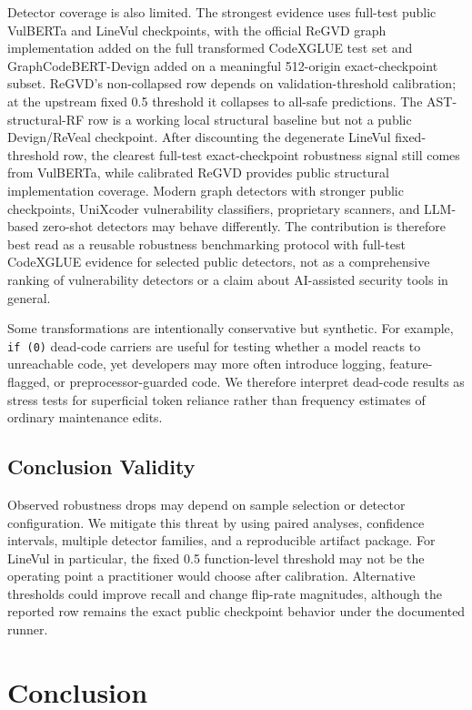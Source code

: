 \documentclass[a4paper,fleqn]{cas-dc}
\begin{document}
Detector coverage is also limited. The strongest evidence uses full-test public
VulBERTa and LineVul checkpoints, with the official ReGVD graph implementation
added on the full transformed CodeXGLUE test set and GraphCodeBERT-Devign added
on a meaningful 512-origin exact-checkpoint subset. ReGVD's non-collapsed row
depends on validation-threshold calibration; at the upstream fixed 0.5
threshold it collapses to all-safe predictions. The AST-structural-RF row is a
working local structural baseline but not a public Devign/ReVeal checkpoint.
After discounting the degenerate LineVul fixed-threshold row, the clearest
full-test exact-checkpoint robustness signal still comes from VulBERTa, while
calibrated ReGVD provides public structural implementation coverage. Modern
graph detectors with stronger public checkpoints, UniXcoder vulnerability
classifiers, proprietary scanners, and LLM-based zero-shot detectors may behave
differently. The contribution is therefore best read as a reusable robustness
benchmarking protocol with full-test CodeXGLUE evidence for selected public
detectors, not as a comprehensive ranking of vulnerability detectors or a claim
about AI-assisted security tools in general.

Some transformations are intentionally conservative but synthetic. For
example, \texttt{if (0)} dead-code carriers are useful for testing whether a
model reacts to unreachable code, yet developers may more often introduce
logging, feature-flagged, or preprocessor-guarded code. We therefore interpret
dead-code results as stress tests for superficial token reliance rather than
frequency estimates of ordinary maintenance edits.

\subsection{Conclusion Validity}

Observed robustness drops may depend on sample selection or detector
configuration. We mitigate this threat by using paired analyses, confidence
intervals, multiple detector families, and a reproducible artifact package.
For LineVul in particular, the fixed 0.5 function-level threshold may not be
the operating point a practitioner would choose after calibration. Alternative
thresholds could improve recall and change flip-rate magnitudes, although the
reported row remains the exact public checkpoint behavior under the documented
runner.

\section{Conclusion}
\end{document}
